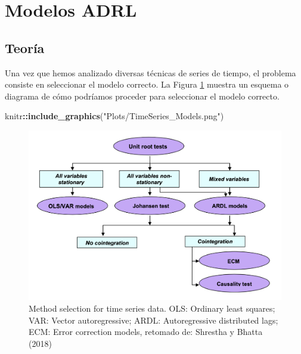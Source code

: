 \documentclass[
]{book}
\newenvironment{Shaded}{\begin{snugshade}}{\end{snugshade}}
\newcommand{\FunctionTok}[1]{\textcolor[rgb]{0.13,0.29,0.53}{\textbf{#1}}}
\newcommand{\NormalTok}[1]{#1}
\newcommand{\SpecialCharTok}[1]{\textcolor[rgb]{0.81,0.36,0.00}{\textbf{#1}}}
\newcommand{\StringTok}[1]{\textcolor[rgb]{0.31,0.60,0.02}{#1}}
\begin{document}
\hypertarget{modelos-adrl}{%
\section{Modelos ADRL}\label{modelos-adrl}}

\hypertarget{teoruxeda}{%
\subsection{Teoría}\label{teoruxeda}}

Una vez que hemos analizado diversas técnicas de series de tiempo, el
problema consiste en seleccionar el modelo correcto. La Figura
\ref{fig:fig91} muestra un esquema o diagrama de cómo podríamos
proceder para seleccionar el modelo correcto.

\begin{Shaded}
\begin{Highlighting}[]
\NormalTok{knitr}\SpecialCharTok{::}\FunctionTok{include\_graphics}\NormalTok{(}\StringTok{"Plots/TimeSeries\_Models.png"}\NormalTok{) }
\end{Highlighting}
\end{Shaded}

\begin{figure}

{\centering \includegraphics[width=0.95\linewidth]{Plots/TimeSeries_Models} 

}

\caption{Method selection for time series data. OLS: Ordinary least squares; VAR: Vector autoregressive; ARDL: Autoregressive distributed lags; ECM: Error correction models, retomado de: Shrestha y Bhatta (2018)}\label{fig:fig91}
\end{figure}
\end{document}
